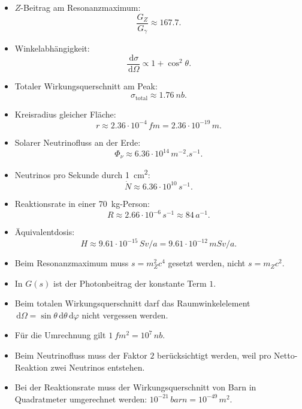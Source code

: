 \documentclass[11pt,a4paper]{scrartcl}
\newcommand{\dd}{\,\mathrm{d}}
\newcommand{\diffxs}{\frac{\dd\sigma}{\dd\Omega}}
\theoremstyle{definition}
\theoremstyle{plain}
\theoremstyle{remark}
\begin{document}
\begin{summarybox}[title=Endergebnisse]
\begin{itemize}
    \item $Z$-Beitrag am Resonanzmaximum:
    \[
        \frac{G_Z}{G_\gamma}\approx167.7.
    \]
    \item Winkelabhängigkeit:
    \[
        \diffxs\propto1+\cos^2\theta.
    \]
    \item Totaler Wirkungsquerschnitt am Peak:
    \[
        \sigma_{\mathrm{total}}\approx\SI{1.76}{nb}.
    \]
    \item Kreisradius gleicher Fläche:
    \[
        r\approx2.36\cdot10^{-4}\,\si{fm}=2.36\cdot10^{-19}\,\si{m}.
    \]
    \item Solarer Neutrinofluss an der Erde:
    \[
        \Phi_\nu\approx6.36\cdot10^{14}\,\si{m^{-2}.s^{-1}}.
    \]
    \item Neutrinos pro Sekunde durch \SI{1}{cm^2}:
    \[
        \dot N\approx6.36\cdot10^{10}\,\si{s^{-1}}.
    \]
    \item Reaktionsrate in einer \SI{70}{kg}-Person:
    \[
        R\approx2.66\cdot10^{-6}\,\si{s^{-1}}\approx84\,\si{a^{-1}}.
    \]
    \item Äquivalentdosis:
    \[
        H\approx9.61\cdot10^{-15}\,\si{Sv/a}=9.61\cdot10^{-12}\,\si{mSv/a}.
    \]
\end{itemize}
\end{summarybox}

\begin{warningbox}[title=Typische Fehler]
\begin{itemize}
    \item Beim Resonanzmaximum muss $s=m_Z^2c^4$ gesetzt werden, nicht $s=m_Zc^2$.
    \item In $G(s)$ ist der Photonbeitrag der konstante Term $1$.
    \item Beim totalen Wirkungsquerschnitt darf das Raumwinkelelement $\dd\Omega=\sin\theta\dd\theta\dd\varphi$ nicht vergessen werden.
    \item Für die Umrechnung gilt $\SI{1}{fm^2}=10^7\,\si{nb}$.
    \item Beim Neutrinofluss muss der Faktor $2$ berücksichtigt werden, weil pro Netto-Reaktion zwei Neutrinos entstehen.
    \item Bei der Reaktionsrate muss der Wirkungsquerschnitt von Barn in Quadratmeter umgerechnet werden: $10^{-21}\,\si{barn}=10^{-49}\,\si{m^2}$.
\end{itemize}
\end{warningbox}
\end{document}
